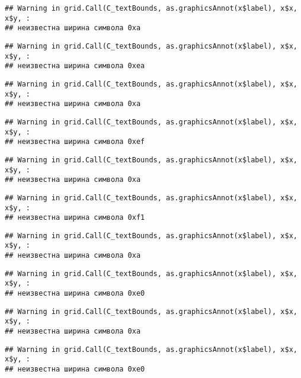 \documentclass[
]{article}
\begin{document}
\begin{verbatim}
## Warning in grid.Call(C_textBounds, as.graphicsAnnot(x$label), x$x, x$y, :
## неизвестна ширина символа 0xa
\end{verbatim}

\begin{verbatim}
## Warning in grid.Call(C_textBounds, as.graphicsAnnot(x$label), x$x, x$y, :
## неизвестна ширина символа 0xea
\end{verbatim}

\begin{verbatim}
## Warning in grid.Call(C_textBounds, as.graphicsAnnot(x$label), x$x, x$y, :
## неизвестна ширина символа 0xa
\end{verbatim}

\begin{verbatim}
## Warning in grid.Call(C_textBounds, as.graphicsAnnot(x$label), x$x, x$y, :
## неизвестна ширина символа 0xef
\end{verbatim}

\begin{verbatim}
## Warning in grid.Call(C_textBounds, as.graphicsAnnot(x$label), x$x, x$y, :
## неизвестна ширина символа 0xa
\end{verbatim}

\begin{verbatim}
## Warning in grid.Call(C_textBounds, as.graphicsAnnot(x$label), x$x, x$y, :
## неизвестна ширина символа 0xf1
\end{verbatim}

\begin{verbatim}
## Warning in grid.Call(C_textBounds, as.graphicsAnnot(x$label), x$x, x$y, :
## неизвестна ширина символа 0xa
\end{verbatim}

\begin{verbatim}
## Warning in grid.Call(C_textBounds, as.graphicsAnnot(x$label), x$x, x$y, :
## неизвестна ширина символа 0xe0
\end{verbatim}

\begin{verbatim}
## Warning in grid.Call(C_textBounds, as.graphicsAnnot(x$label), x$x, x$y, :
## неизвестна ширина символа 0xa
\end{verbatim}

\begin{verbatim}
## Warning in grid.Call(C_textBounds, as.graphicsAnnot(x$label), x$x, x$y, :
## неизвестна ширина символа 0xe0
\end{verbatim}
\end{document}
